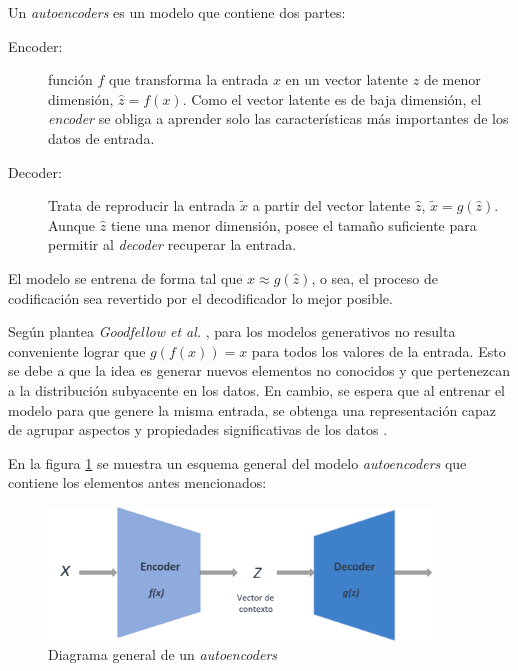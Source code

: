 Un \textit{autoencoders} es un modelo que contiene dos partes:
\begin{description}
	\item[Encoder: ]  función $f$ que transforma la entrada $x$ en un vector latente $\hat{z}$ de menor dimensión, $\hat{z} = f(x)$. Como el vector latente es de baja dimensión, el \textit{encoder} se obliga a aprender solo las características más importantes de los datos de entrada. 
	\item[Decoder: ] Trata de reproducir la entrada $\tilde{x}$ a partir del vector latente $\hat{z}$, $\tilde{x} = g(\hat{z})$. Aunque $\hat{z}$ tiene una menor dimensión, posee el tamaño suficiente para permitir al \textit{decoder} recuperar la entrada.
\end{description}
El modelo se entrena de forma tal que $x \approx g(\hat{z})$, o sea, el proceso de codificación sea revertido por el decodificador lo mejor posible. 

Según plantea \textit{Goodfellow et al.} \cite{BengioGood}, para los modelos generativos no resulta conveniente lograr que $g(f(x)) = x$ para todos los valores de la entrada. Esto se debe a que la idea es generar nuevos elementos no conocidos y que pertenezcan a la distribución subyacente en los datos. En cambio, se espera que al entrenar el modelo para que genere la misma entrada, se obtenga una representación capaz de agrupar aspectos y propiedades significativas de los datos \cite{BengioGood}.

 En la figura \ref{AEdiagram} se muestra un esquema general del modelo  \textit{autoencoders} que contiene los elementos antes mencionados:

\begin{figure}[!h]
	
	\centering
	
	\includegraphics[width=4in]{Graphics/AEdiagram.png}
	
	\caption{\small{Diagrama general de un \textit{autoencoders}}}
	
	\label{AEdiagram}
	
\end{figure}


